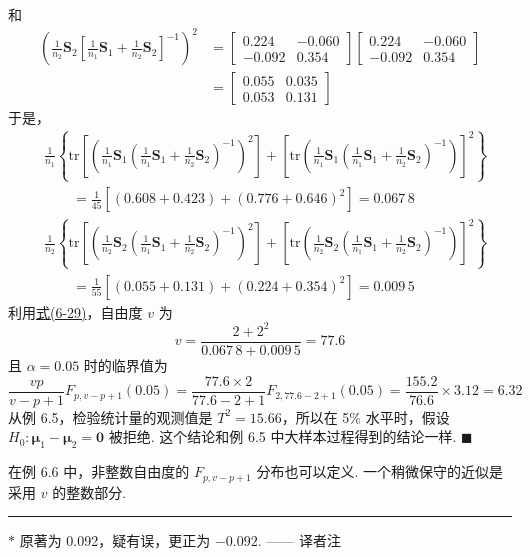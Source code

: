 和
\begin{align*}
\left(\frac{1}{n_2}\mathbf{S}_2\left[\frac{1}{n_1}\mathbf{S}_1+\frac{1}{n_2}\mathbf{S}_2\right]^{-1}\right)^2&=\begin{bmatrix}0.224&-0.060\\-0.092&0.354\end{bmatrix}\begin{bmatrix}0.224&-0.060\\-0.092&0.354\end{bmatrix}\\
&=\begin{bmatrix}0.055&0.035\\0.053&0.131\end{bmatrix}
\end{align*}
于是，
\begin{align*}
&\frac{1}{n_1}\left\{\mathrm{tr}\left[\left(\frac{1}{n_1}\mathbf{S}_1\left(\frac{1}{n_1}\mathbf{S}_1+\frac{1}{n_2}\mathbf{S}_2\right)^{-1}\right)^2\right]+\left[\mathrm{tr}\left(\frac{1}{n_1}\mathbf{S}_1\left(\frac{1}{n_1}\mathbf{S}_1+\frac{1}{n_2}\mathbf{S}_2\right)^{-1}\right)\right]^2\right\}\\
&\qquad=\frac{1}{45}[(0.608+0.423)+(0.776+0.646)^2]=0.067\,8
\end{align*}
\begin{align*}
&\frac{1}{n_2}\left\{\mathrm{tr}\left[\left(\frac{1}{n_2}\mathbf{S}_2\left(\frac{1}{n_1}\mathbf{S}_1+\frac{1}{n_2}\mathbf{S}_2\right)^{-1}\right)^2\right]+\left[\mathrm{tr}\left(\frac{1}{n_2}\mathbf{S}_2\left(\frac{1}{n_1}\mathbf{S}_1+\frac{1}{n_2}\mathbf{S}_2\right)^{-1}\right)\right]^2\right\}\\
&\qquad=\frac{1}{55}[(0.055+0.131)+(0.224+0.354)^2]=0.009\,5
\end{align*}
利用\hyperref[eq:6-29]{式(6-29)}，自由度 $v$ 为
\[
v=\frac{2+2^2}{0.067\,8+0.009\,5}=77.6
\]
且 $\alpha=0.05$ 时的临界值为
\[
\frac{vp}{v-p+1}F_{p,v-p+1}(0.05)=\frac{77.6\times 2}{77.6-2+1}F_{2,77.6-2+1}(0.05)=\frac{155.2}{76.6}\times 3.12=6.32
\]
从例 6.5，检验统计量的观测值是 $T^2=15.66$，所以在 5\% 水平时，假设 $H_0: \boldsymbol{\mu}_1-\boldsymbol{\mu}_2=\mathbf{0}$ 被拒绝. 这个结论和例 6.5 中大样本过程得到的结论一样. \hfill$\blacksquare$

在例 6.6 中，非整数自由度的 $F_{p,v-p+1}$ 分布也可以定义. 一个稍微保守的近似是采用 $v$ 的整数部分.

\noindent\rule{\linewidth}{0.4pt}

{\small $\ast$ 原著为 0.092，疑有误，更正为 $-0.092$. —— 译者注}
